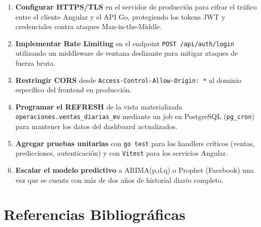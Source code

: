 \documentclass[12pt,a4paper,oneside]{report}
\begin{document}
\begin{enumerate}[leftmargin=1.5cm, label=\textbf{\arabic*.}]
  \item \textbf{Configurar HTTPS/TLS} en el servidor de producción para cifrar el tráfico entre el cliente Angular y el API Go, protegiendo los tokens JWT y credenciales contra ataques Man-in-the-Middle.
  \item \textbf{Implementar Rate Limiting} en el endpoint \texttt{POST /api/auth/login} utilizando un middleware de ventana deslizante para mitigar ataques de fuerza bruta.
  \item \textbf{Restringir CORS} desde \texttt{Access-Control-Allow-Origin: *} al dominio específico del frontend en producción.
  \item \textbf{Programar el REFRESH} de la vista materializada \texttt{operaciones.ventas\_diarias\_mv} mediante un job en PostgreSQL (\texttt{pg\_cron}) para mantener los datos del dashboard actualizados.
  \item \textbf{Agregar pruebas unitarias} con \texttt{go test} para los handlers críticos (ventas, predicciones, autenticación) y con \texttt{Vitest} para los servicios Angular.
  \item \textbf{Escalar el modelo predictivo} a ARIMA(p,d,q) o Prophet (Facebook) una vez que se cuente con más de dos años de historial diario completo.
\end{enumerate}

\chapter*{Referencias Bibliográficas}
\end{document}
